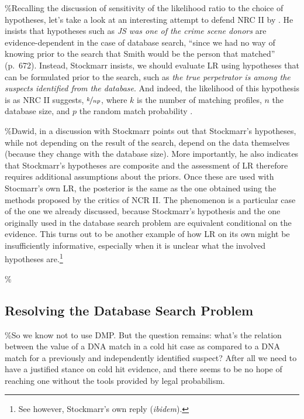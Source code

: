 \documentclass[10pt,dvipsnames,enabledeprecatedfontcommands]{scrartcl}
\begin{document}
\%Recalling the discussion of sensitivity of the likelihood ratio to the
choice of hypotheses, let's take a look at an interesting attempt to
defend NRC II by \citet{stockmarr1999LikelihoodRatiosEvaluating}. He
insists that hypotheses such as
\emph{JS was one of the crime scene donors} are evidence-dependent in
the case of database search, ``since we had no way of knowing prior to
the search that Smith would be the person that matched'' (p.~672).
Instead, Stockmarr insists, we should evaluate LR using hypotheses that
can be formulated prior to the search, such as
\emph{the true perpetrator is among the suspects identified from the database}.
And indeed, the likelihood of this hypothesis is as NRC II suggests,
\(\nicefrac{k}{np}\), where \(k\) is the number of matching profiles,
\(n\) the database size, and \(p\) the random match probability
\citep[see][for a derivation]{stockmarr1999LikelihoodRatiosEvaluating}.

\%Dawid, in a discussion with Stockmarr
\citep{dawid2001CommentStockmarrLikelihood} points out that Stockmarr's
hypotheses, while not depending on the result of the search, depend on
the data themselves (because they change with the database size). More
importantly, he also indicates that Stockmarr's hypotheses are composite
and the assessment of LR therefore requires additional assumptions about
the priors. Once these are used with Stocmarr's own LR, the posterior is
the same as the one obtained using the methods proposed by the critics
of NCR II. The phenomenon is a particular case of the one we already
discussed, because Stockmarr's hypothesis and the one originally used in
the database search problem are equivalent conditional on the evidence.
This turns out to be another example of how LR on its own might be
insufficiently informative, especially when it is unclear what the
involved hypotheses
are.\footnote{See however, Stockmarr's own reply (\emph{ibidem}).}

\%\subsection{Resolving the Database Search Problem}

\%So we know not to use DMP. But the question remains: what's the
relation between the value of a DNA match in a cold hit case as compared
to a DNA match for a previously and independently identified suspect?
After all we need to have a justified stance on cold hit evidence, and
there seems to be no hope of reaching one without the tools provided by
legal probabilism.
\end{document}
